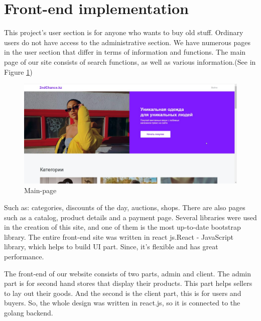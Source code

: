 \section{Front-end implementation}
This project's user section is for anyone who wants to buy old stuff. Ordinary users do not have access to the administrative section. We have numerous pages in the user section that differ in terms of information and functions. The main page of our site consists of search functions, as well as various information.(See in Figure \ref{fig:front-end})
\begin{figure}[h!]
    \centering
    \includegraphics[scale=0.6]{figures/front-end.jpg}
    \caption{Main-page}
    \label{fig:front-end}
\end{figure}

Such as: categories, discounts of the day, auctions, shops. There are also pages such as a catalog, product details and a payment page. Several libraries were used in the creation of this site, and one of them is the most up-to-date bootstrap library. The entire front-end site was written in react js.React - JavaScript library, which helps to build UI part. Since, it's flexible and has great performance\cite{react}.

The front-end of our website consists of two parts, admin and client. The admin part is for second hand stores that display their products. This part helps sellers to lay out their goods. And the second is the client part, this is for users and buyers. So, the whole design was written in react.js, so it is connected to the golang backend.
